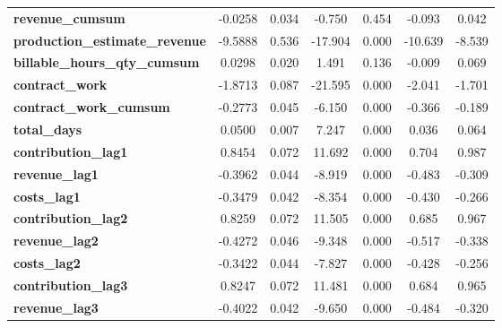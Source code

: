 \begin{center}
\begin{tabular}{lcccccc}
\textbf{revenue\_cumsum}                    &      -0.0258  &        0.034     &    -0.750  &         0.454        &       -0.093    &        0.042     \\
\textbf{production\_estimate\_revenue}      &      -9.5888  &        0.536     &   -17.904  &         0.000        &      -10.639    &       -8.539     \\
\textbf{billable\_hours\_qty\_cumsum}       &       0.0298  &        0.020     &     1.491  &         0.136        &       -0.009    &        0.069     \\
\textbf{contract\_work}                     &      -1.8713  &        0.087     &   -21.595  &         0.000        &       -2.041    &       -1.701     \\
\textbf{contract\_work\_cumsum}             &      -0.2773  &        0.045     &    -6.150  &         0.000        &       -0.366    &       -0.189     \\
\textbf{total\_days}                        &       0.0500  &        0.007     &     7.247  &         0.000        &        0.036    &        0.064     \\
\textbf{contribution\_lag1}                 &       0.8454  &        0.072     &    11.692  &         0.000        &        0.704    &        0.987     \\
\textbf{revenue\_lag1}                      &      -0.3962  &        0.044     &    -8.919  &         0.000        &       -0.483    &       -0.309     \\
\textbf{costs\_lag1}                        &      -0.3479  &        0.042     &    -8.354  &         0.000        &       -0.430    &       -0.266     \\
\textbf{contribution\_lag2}                 &       0.8259  &        0.072     &    11.505  &         0.000        &        0.685    &        0.967     \\
\textbf{revenue\_lag2}                      &      -0.4272  &        0.046     &    -9.348  &         0.000        &       -0.517    &       -0.338     \\
\textbf{costs\_lag2}                        &      -0.3422  &        0.044     &    -7.827  &         0.000        &       -0.428    &       -0.256     \\
\textbf{contribution\_lag3}                 &       0.8247  &        0.072     &    11.481  &         0.000        &        0.684    &        0.965     \\
\textbf{revenue\_lag3}                      &      -0.4022  &        0.042     &    -9.650  &         0.000        &       -0.484    &       -0.320     \\

\end{tabular}
\end{center}
